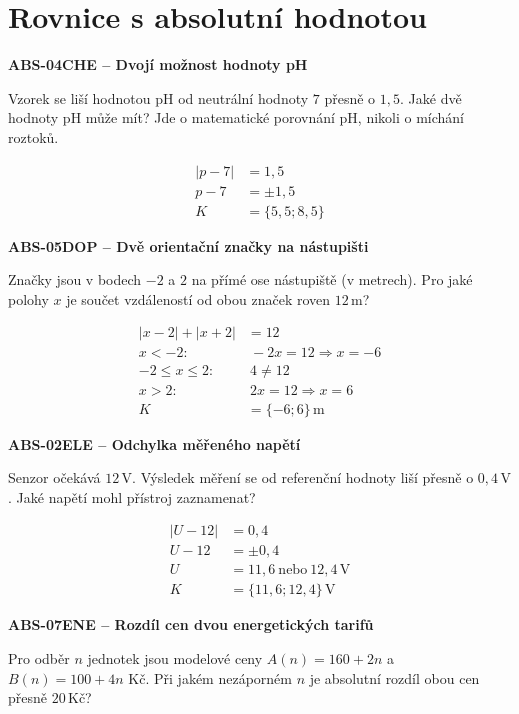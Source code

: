 \documentclass[11pt,a4paper]{article}
\begin{document}
\section{Rovnice s absolutní hodnotou}
\par\medskip\noindent
\textbf{ABS-04}\quad\textbf{CHE -- Dvojí možnost hodnoty pH}\par
Vzorek se liší hodnotou pH od neutrální hodnoty $7$ přesně o $1{,}5$. Jaké dvě hodnoty pH může mít? Jde o matematické porovnání pH, nikoli o míchání roztoků.
\par\[\begin{aligned}
|p-7|&=1{,}5\\p-7&=\pm1{,}5\\K&=\{5{,}5;8{,}5\}
\end{aligned}\]
\par\medskip\noindent
\textbf{ABS-05}\quad\textbf{DOP -- Dvě orientační značky na nástupišti}\par
Značky jsou v bodech $-2$ a $2$ na přímé ose nástupiště (v metrech). Pro jaké polohy $x$ je součet vzdáleností od obou značek roven $12\,\mathrm m$?
\par\[\begin{aligned}
|x-2|+|x+2|&=12\\x<-2:&\ -2x=12\Rightarrow x=-6\\-2\le x\le2:&\ 4\ne12\\x>2:&\ 2x=12\Rightarrow x=6\\K&=\{-6;6\}\,\mathrm m
\end{aligned}\]
\par\medskip\noindent
\textbf{ABS-02}\quad\textbf{ELE -- Odchylka měřeného napětí}\par
Senzor očekává $12\,\mathrm V$. Výsledek měření se od referenční hodnoty liší přesně o $0{,}4\,\mathrm V$. Jaké napětí mohl přístroj zaznamenat?
\par\[\begin{aligned}
|U-12|&=0{,}4\\U-12&=\pm0{,}4\\U&=11{,}6\ \text{nebo}\ 12{,}4\,\mathrm V\\K&=\{11{,}6;12{,}4\}\,\mathrm V
\end{aligned}\]
\par\medskip\noindent
\textbf{ABS-07}\quad\textbf{ENE -- Rozdíl cen dvou energetických tarifů}\par
Pro odběr $n$ jednotek jsou modelové ceny $A(n)=160+2n$ a $B(n)=100+4n$ Kč. Při jakém nezáporném $n$ je absolutní rozdíl obou cen přesně $20\,\text{Kč}$?
\end{document}
